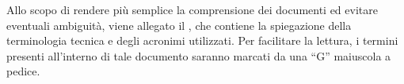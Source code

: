 	Allo scopo di rendere più semplice la comprensione dei documenti ed evitare eventuali ambiguità, viene allegato il , che contiene la spiegazione della terminologia tecnica e degli acronimi utilizzati. Per facilitare la lettura, i termini presenti all'interno di tale documento saranno marcati da una “G” maiuscola a pedice.
